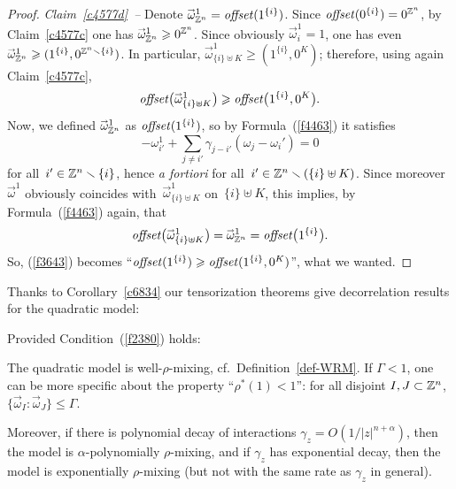 \begin{proof}
\indent\textit{Claim~\ref{c4577d}\ --} Denote
$\vec\omega^{1}_{\ZZ^n} = \offset(1^{\{i\}})$.
Since $\mathit{offset}(0^{\{i\}}) = 0^{\mathbb{Z}^n}$, by Claim~\ref{c4577c}
one has ${\vec\omega^1_{\ZZ^n} \geq 0^{\ZZ^n}}$.
Since obviously $\vec\omega^1_i = 1$, one has even
$\vec\omega^1_{\ZZ^n} \geq (1^{\{i\}},0^{\ZZ^n\setminus\{i\}})$.
In particular, $\vec\omega^1_{\{i\}\uplus K} \geq (1^{\{i\}},0^K)$;
therefore, using again Claim~\ref{c4577c},
\[\label{f3643} \offset\big(\vec\omega^1_{\{i\}\uplus K}\big) \geq \offset\big(1^{\{i\}},0^K\big).\]
%
Now, we defined $\vec\omega^1_{\ZZ^n}$ as $\mathit{offset}(1^{\{i\}})$,
so by Formula~(\ref{f4463}) it satisfies
\[ -\omega^1_{i'} + \sum_{j\neq i'} \gamma_{j-i'}(\omega_j-\omega_i') = 0 \]
for all~$i' \in \mathbb{Z}^n\smallsetminus\{i\}$, hence \emph{a fortiori}
for all~$i'\in \mathbb{Z}^n\smallsetminus(\{i\}\uplus K)$.
Since moreover $\vec\omega^1$ obviously coincides with~$\vec\omega^1_{\{i\}\uplus K}$
on~$\{i\} \uplus K$, this implies, by Formula~(\ref{f4463}) again, that
\[ \offset\big( \vec\omega^1_{\{i\}\uplus K} \big) =
\vec\omega^1_{\ZZ^n} = \offset\big( 1^{\{i\}} \big) .\]
So, (\ref{f3643}) becomes ``$\mathit{offset}(1^{\{i\}}) \geqslant \mathit{offset}(1^{\{i\}},0^K)$'',
what we wanted.
\end{proof}\endgroup

Thanks to Corollary~\ref{c6834} our tensorization theorems give decorrelation results
for the quadratic model:
%
\begin{Thm}\label{thmTchou}
Provided Condition~(\ref{f2380}) holds:
\begin{ienumerate}
\item\label{i4805} The quadratic model is well-$\rho$-mixing, cf.\ Definition~\ref{def-WRM}.
If $\Gamma < 1$, one can be more specific about the property ``$\rho^*(1)<1$'':
for all disjoint $I,J\subset\mathbb{Z}^n$, ${\{\vec\omega_I:\vec\omega_J\}} \leq \Gamma$.
\item\label{i4806} Moreover, if there is polynomial decay of interactions
$\gamma_{z} = O(1/|z|^{n+\alpha})$, then the model is $\alpha$-polynomially $\rho$-mixing,
and if $\gamma_{z}$ has exponential decay,
then the model is exponentially $\rho$-mixing (but not with the same rate as $\gamma_z$ in general).
\end{ienumerate}
\end{Thm}

